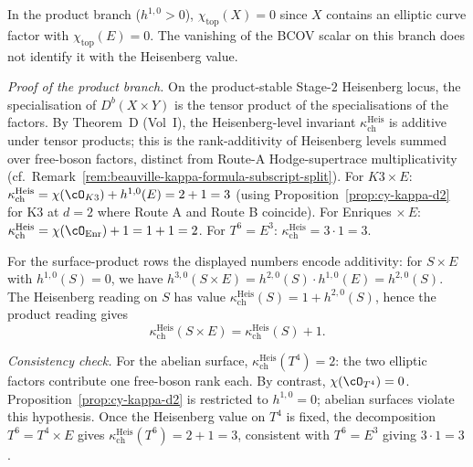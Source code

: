 \begin{proposition}[Beauville branch split for constructed scalar lanes at
\texorpdfstring{$d = 3$}{d = 3}]
In the product branch ($h^{1,0} > 0$), $\chi_{\mathrm{top}}(X) = 0$ since $X$ contains an elliptic curve factor with $\chi_{\mathrm{top}}(E) = 0$. The vanishing of the BCOV scalar on this branch does not identify it with the Heisenberg value.

\smallskip
\noindent\textit{Proof of the product branch.}
On the product-stable Stage-$2$ Heisenberg locus, the specialisation of $D^b(X \times Y)$ is the tensor product of the specialisations of the factors. By Theorem~D \textup{(}Vol~I\textup{)}, the Heisenberg-level invariant $\kappa_{\mathrm{ch}}^{\mathrm{Heis}}$ is additive under tensor products; this is the rank-additivity of Heisenberg levels summed over free-boson factors, distinct from Route-A Hodge-supertrace multiplicativity (cf.\ Remark~\textup{\ref{rem:beauville-kappa-formula-subscript-split}}). For $K3 \times E$: $\kappa_{\mathrm{ch}}^{\mathrm{Heis}} = \chi(\cO_{K3}) + h^{1,0}(E) = 2 + 1 = 3$ \textup{(}using Proposition~\textup{\ref{prop:cy-kappa-d2}} for K3 at $d = 2$ where Route A and Route B coincide\textup{)}. For Enriques $\times\, E$: $\kappa_{\mathrm{ch}}^{\mathrm{Heis}} = \chi(\cO_{\mathrm{Enr}}) + 1 = 1 + 1 = 2$. For $T^6 = E^3$: $\kappa_{\mathrm{ch}}^{\mathrm{Heis}} = 3 \cdot 1 = 3$.

For the surface-product rows the displayed numbers encode additivity:
for \(S\times E\) with \(h^{1,0}(S)=0\), we have
$h^{3,0}(S \times E) = h^{2,0}(S) \cdot h^{1,0}(E) = h^{2,0}(S)$.
The Heisenberg reading on $S$ has value
$\kappa_{\mathrm{ch}}^{\mathrm{Heis}}(S) = 1 + h^{2,0}(S)$, hence the
product reading gives
\[
\kappa_{\mathrm{ch}}^{\mathrm{Heis}}(S \times E)
=
\kappa_{\mathrm{ch}}^{\mathrm{Heis}}(S)+1.
\]

\smallskip
\noindent\textit{Consistency check.} For the abelian surface,
$\kappa_{\mathrm{ch}}^{\mathrm{Heis}}(T^4) = 2$: the two elliptic
factors contribute one free-boson rank each. By contrast,
$\chi(\cO_{T^4}) = 0$. Proposition~\textup{\ref{prop:cy-kappa-d2}} is
restricted to $h^{1,0} = 0$; abelian surfaces violate this hypothesis.
Once the Heisenberg value on $T^4$ is fixed, the decomposition
$T^6 = T^4 \times E$ gives
$\kappa_{\mathrm{ch}}^{\mathrm{Heis}}(T^6) = 2 + 1 = 3$, consistent
with $T^6 = E^3$ giving $3 \cdot 1 = 3$.

\smallskip
\end{proposition}


